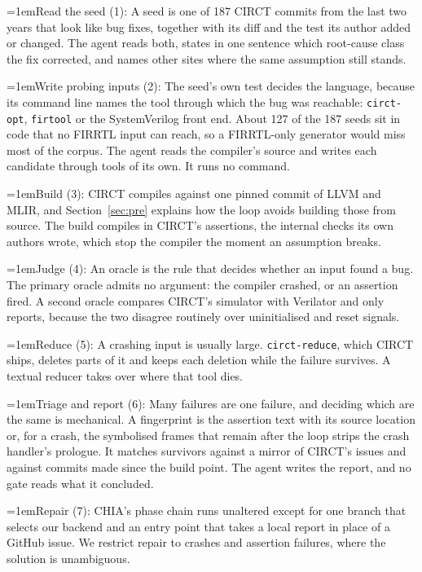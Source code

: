 \documentclass[conference]{IEEEtran}
\newcommand{\pointhead}[1]{\par\noindent\hangindent=1em\hangafter=1\makebox[1em][l]{\textbullet}#1:}
\begin{document}
\pointhead{Read the seed (1)} A seed is one of 187 CIRCT commits from the last two
years that look like bug fixes, together with its diff and the test its author
added or changed. The agent reads both, states in one sentence which root-cause
class the fix corrected, and names other sites where the same assumption still
stands. %

\pointhead{Write probing inputs (2)} The seed's own test decides the language,
because its command line names the tool through which the bug was reachable:
\texttt{circt-opt}, \texttt{firtool} or the SystemVerilog front end. About 127
of the 187 seeds sit in code that no FIRRTL input can reach, so a FIRRTL-only
generator would miss most of the corpus. The agent reads the compiler's source
and writes each candidate through tools of its own. It runs no command.

\pointhead{Build (3)} CIRCT compiles against one pinned commit of LLVM and MLIR,
and Section~\ref{sec:pre} explains how the loop avoids building those from
source. The build compiles in CIRCT's assertions, the internal checks its own
authors wrote, which stop the compiler the moment an assumption breaks.

\pointhead{Judge (4)} An oracle is the rule that decides whether an input found a
bug. The primary oracle admits no argument: the compiler crashed, or an
assertion fired. A second oracle compares CIRCT's simulator with Verilator and
only reports, because the two disagree routinely over uninitialised and reset
signals.

\pointhead{Reduce (5)} A crashing input is usually large. \texttt{circt-reduce},
which CIRCT ships, deletes parts of it and keeps each deletion while the failure
survives. A textual reducer takes over where that tool dies.

\pointhead{Triage and report (6)} Many failures are one failure, and deciding
which are the same is mechanical. A fingerprint is the assertion text with its
source location or, for a crash, the symbolised frames that remain after the
loop strips the crash handler's prologue. It matches survivors against a mirror of
CIRCT's issues and against commits made since the build point. The agent writes
the report, and no gate reads what it concluded. %

\pointhead{Repair (7)} CHIA's phase chain runs unaltered except for one branch
that selects our backend and an entry point that takes a local report in place
of a GitHub issue. We restrict repair to crashes and assertion failures, where the solution is unambiguous.
\end{document}
